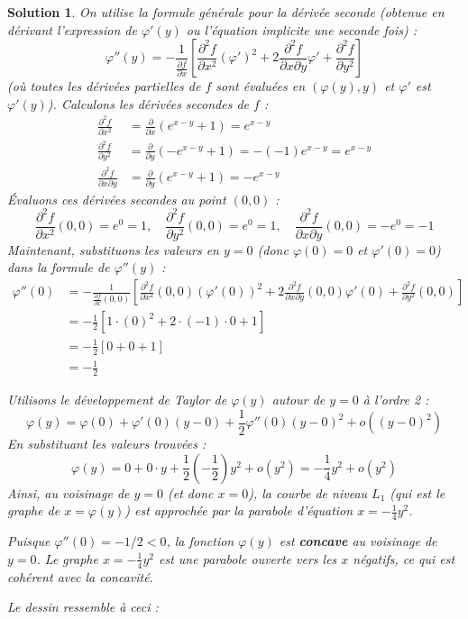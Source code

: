 \documentclass[10pt]{article}
\theoremstyle{frenchstyle}
\newtheorem{solution}{Solution}
\begin{document}
\begin{solution}
	On utilise la formule générale pour la dérivée seconde (obtenue en dérivant l'expression de $\varphi'(y)$ ou l'équation implicite une seconde fois) :
	\[
		\varphi''(y) = - \frac{1}{\frac{\partial f}{\partial x}} \left[ \frac{\partial^2 f}{\partial x^2} (\varphi')^2 + 2 \frac{\partial^2 f}{\partial x \partial y} \varphi' + \frac{\partial^2 f}{\partial y^2} \right]
	\]
	(où toutes les dérivées partielles de $f$ sont évaluées en $(\varphi(y), y)$ et $\varphi'$ est $\varphi'(y)$).
	Calculons les dérivées secondes de $f$ :
	\begin{align*} \frac{\partial^2 f}{\partial x^2} &= \frac{\partial}{\partial x} (e^{x-y} + 1) = e^{x-y} \\ \frac{\partial^2 f}{\partial y^2} &= \frac{\partial}{\partial y} (-e^{x-y} + 1) = -(-1)e^{x-y} = e^{x-y} \\ \frac{\partial^2 f}{\partial x \partial y} &= \frac{\partial}{\partial y} (e^{x-y} + 1) = -e^{x-y} \end{align*}
	Évaluons ces dérivées secondes au point $(0,0)$ :
	\[
		\frac{\partial^2 f}{\partial x^2}(0,0) = e^0 = 1, \quad
		\frac{\partial^2 f}{\partial y^2}(0,0) = e^0 = 1, \quad
		\frac{\partial^2 f}{\partial x \partial y}(0,0) = -e^0 = -1
	\]
	Maintenant, substituons les valeurs en $y=0$ (donc $\varphi(0)=0$ et $\varphi'(0)=0$) dans la formule de $\varphi''(y)$ :
	\begin{align*} \varphi''(0) &= - \frac{1}{\frac{\partial f}{\partial x}(0,0)} \left[ \frac{\partial^2 f}{\partial x^2}(0,0) (\varphi'(0))^2 + 2 \frac{\partial^2 f}{\partial x \partial y}(0,0) \varphi'(0) + \frac{\partial^2 f}{\partial y^2}(0,0) \right] \\ &= - \frac{1}{2} \left[ 1 \cdot (0)^2 + 2 \cdot (-1) \cdot 0 + 1 \right] \\ &= - \frac{1}{2} [0 + 0 + 1] \\ &= -\frac{1}{2} \end{align*}

	Utilisons le développement de Taylor de $\varphi(y)$ autour de $y=0$ à l'ordre 2 :
	\[
		\varphi(y) = \varphi(0) + \varphi'(0)(y-0) + \frac{1}{2} \varphi''(0)(y-0)^2 + o((y-0)^2)
	\]
	En substituant les valeurs trouvées :
	\[
		\varphi(y) = 0 + 0 \cdot y + \frac{1}{2} \left( -\frac{1}{2} \right) y^2 + o(y^2) = -\frac{1}{4} y^2 + o(y^2)
	\]
	Ainsi, au voisinage de $y=0$ (et donc $x=0$), la courbe de niveau $L_1$ (qui est le graphe de $x=\varphi(y)$) est approchée par la parabole d'équation $x = -\frac{1}{4} y^2$.

	Puisque $\varphi''(0) = -1/2 < 0$, la fonction $\varphi(y)$ est \textbf{concave} au voisinage de $y=0$. Le graphe $x = -\frac{1}{4} y^2$ est une parabole ouverte vers les $x$ négatifs, ce qui est cohérent avec la concavité.

	Le dessin ressemble à ceci :

	\begin{figure}[H]
		\centering
		
	\end{figure}
\end{solution}
\end{document}
